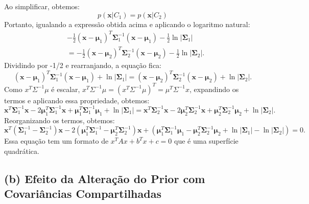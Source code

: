 \documentclass[conference]{IEEEtran}
\begin{document}
Ao simplificar, obtemos:
\[
p(\mathbf{x} | C_1) = p(\mathbf{x} | C_2)
\]
Portanto, igualando a expressão obtida acima e aplicando o logaritmo natural:
\begin{align*}
& -\frac{1}{2} (\mathbf{x} - \boldsymbol{\mu}_1)^T \boldsymbol{\Sigma}_1^{-1} (\mathbf{x} - \boldsymbol{\mu}_1) - \frac{1}{2} \ln |\boldsymbol{\Sigma}_1| \\
&= -\frac{1}{2} (\mathbf{x} - \boldsymbol{\mu}_2)^T \boldsymbol{\Sigma}_2^{-1} (\mathbf{x} - \boldsymbol{\mu}_2) - \frac{1}{2} \ln |\boldsymbol{\Sigma}_2|.
\end{align*}
Dividindo por -1/2 e rearranjando, a equação fica:
\[
(\mathbf{x} - \boldsymbol{\mu}_1)^T \boldsymbol{\Sigma}_1^{-1} (\mathbf{x} - \boldsymbol{\mu}_1) + \ln |\boldsymbol{\Sigma}_1| = (\mathbf{x} - \boldsymbol{\mu}_2)^T \boldsymbol{\Sigma}_2^{-1} (\mathbf{x} - \boldsymbol{\mu}_2) + \ln |\boldsymbol{\Sigma}_2|.
\]
Como $x^T\Sigma^{-1}\mu$ é escalar, $x^T\Sigma^{-1}\mu = (x^T\Sigma^{-1}\mu)^T = \mu ^ T \Sigma ^{-1} x$, expandindo os termos e aplicando essa propriedade, obtemos: 
\[
\mathbf{x}^T \boldsymbol{\Sigma}_1^{-1} \mathbf{x} - 2 \boldsymbol{\mu}_1^T \boldsymbol{\Sigma}_1^{-1} \mathbf{x} + \boldsymbol{\mu}_1^T \boldsymbol{\Sigma}_1^{-1} \boldsymbol{\mu}_1 + \ln |\boldsymbol{\Sigma}_1| = \mathbf{x}^T \boldsymbol{\Sigma}_2^{-1} \mathbf{x} - 2 \boldsymbol{\mu}_2^T \boldsymbol{\Sigma}_2^{-1} \mathbf{x} + \boldsymbol{\mu}_2^T \boldsymbol{\Sigma}_2^{-1} \boldsymbol{\mu}_2 + \ln |\boldsymbol{\Sigma}_2|.
\]
Reorganizando os termos, obtemos:
\[
\mathbf{x}^T (\boldsymbol{\Sigma}_1^{-1} - \boldsymbol{\Sigma}_2^{-1}) \mathbf{x} - 2 (\boldsymbol{\mu}_1^T \boldsymbol{\Sigma}_1^{-1} - \boldsymbol{\mu}_2^T \boldsymbol{\Sigma}_2^{-1}) \mathbf{x} + (\boldsymbol{\mu}_1^T \boldsymbol{\Sigma}_1^{-1} \boldsymbol{\mu}_1 - \boldsymbol{\mu}_2^T \boldsymbol{\Sigma}_2^{-1} \boldsymbol{\mu}_2 + \ln |\boldsymbol{\Sigma}_1| - \ln |\boldsymbol{\Sigma}_2|) = 0.
\]
Essa equação tem um formato de $x^TAx + b^Tx+c = 0$ que é uma superfície quadrática.

\subsection*{(b) Efeito da Alteração do Prior com Covariâncias Compartilhadas}
\end{document}
